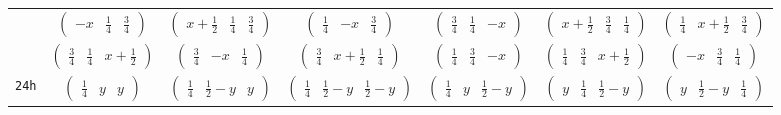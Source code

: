 \documentclass[fleqn,9pt,landscape]{jsarticle}
\begin{document}
\begin{center}
\begin{longtable}{ccccccc}
& $ \begin{pmatrix} - x & \frac{1}{4} & \frac{3}{4} \end{pmatrix} $ & $ \begin{pmatrix} x + \frac{1}{2} & \frac{1}{4} & \frac{3}{4} \end{pmatrix} $ & $ \begin{pmatrix} \frac{1}{4} & - x & \frac{3}{4} \end{pmatrix} $ & $ \begin{pmatrix} \frac{3}{4} & \frac{1}{4} & - x \end{pmatrix} $ & $ \begin{pmatrix} x + \frac{1}{2} & \frac{3}{4} & \frac{1}{4} \end{pmatrix} $ & $ \begin{pmatrix} \frac{1}{4} & x + \frac{1}{2} & \frac{3}{4} \end{pmatrix} $ \\
& $ \begin{pmatrix} \frac{3}{4} & \frac{1}{4} & x + \frac{1}{2} \end{pmatrix} $ & $ \begin{pmatrix} \frac{3}{4} & - x & \frac{1}{4} \end{pmatrix} $ & $ \begin{pmatrix} \frac{3}{4} & x + \frac{1}{2} & \frac{1}{4} \end{pmatrix} $ & $ \begin{pmatrix} \frac{1}{4} & \frac{3}{4} & - x \end{pmatrix} $ & $ \begin{pmatrix} \frac{1}{4} & \frac{3}{4} & x + \frac{1}{2} \end{pmatrix} $ & $ \begin{pmatrix} - x & \frac{3}{4} & \frac{1}{4} \end{pmatrix} $ \\ \hline
{\tt 24h} & $ \begin{pmatrix} \frac{1}{4} & y & y \end{pmatrix} $ & $ \begin{pmatrix} \frac{1}{4} & \frac{1}{2} - y & y \end{pmatrix} $ & $ \begin{pmatrix} \frac{1}{4} & \frac{1}{2} - y & \frac{1}{2} - y \end{pmatrix} $ & $ \begin{pmatrix} \frac{1}{4} & y & \frac{1}{2} - y \end{pmatrix} $ & $ \begin{pmatrix} y & \frac{1}{4} & \frac{1}{2} - y \end{pmatrix} $ & $ \begin{pmatrix} y & \frac{1}{2} - y & \frac{1}{4} \end{pmatrix} $ \\

\end{longtable}
\end{center}
\end{document}
